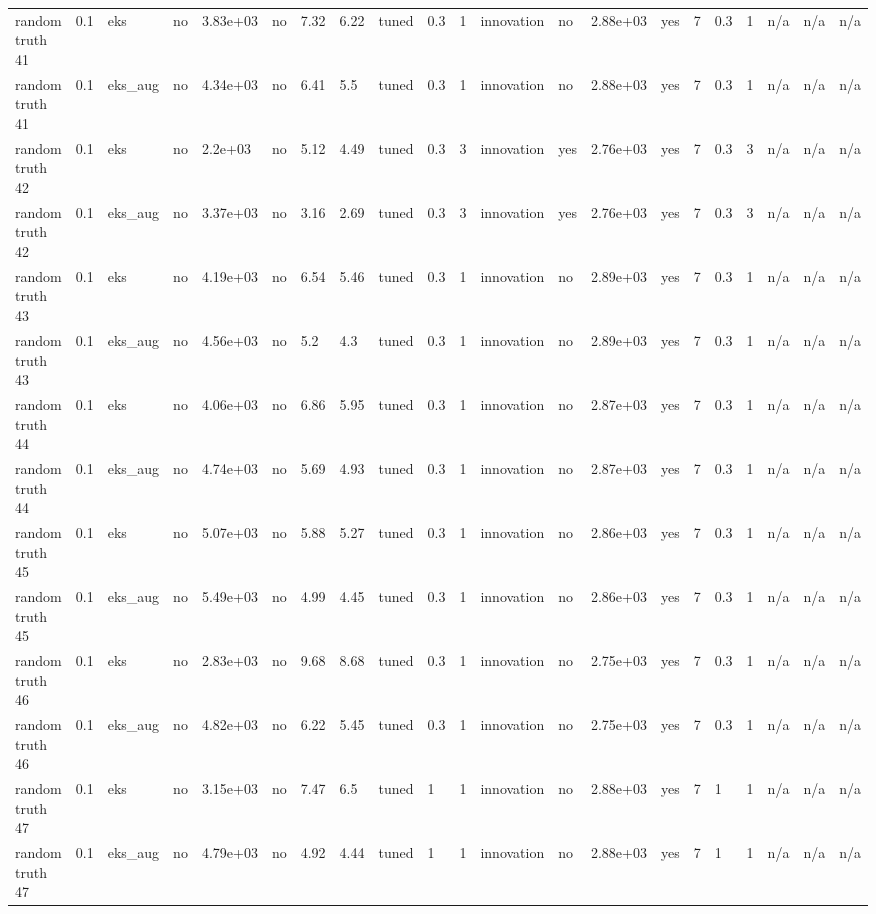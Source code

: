 \begin{table}[t]
\begin{tabular}{lllllllllllllllllllll}
random truth 41 & 0.1 & eks & no & 3.83e+03 & no & 7.32 & 6.22 & tuned & 0.3 & 1 & innovation & no & 2.88e+03 & yes & 7 & 0.3 & 1 & n/a & n/a & n/a \\
random truth 41 & 0.1 & eks\_aug & no & 4.34e+03 & no & 6.41 & 5.5 & tuned & 0.3 & 1 & innovation & no & 2.88e+03 & yes & 7 & 0.3 & 1 & n/a & n/a & n/a \\
random truth 42 & 0.1 & eks & no & 2.2e+03 & no & 5.12 & 4.49 & tuned & 0.3 & 3 & innovation & yes & 2.76e+03 & yes & 7 & 0.3 & 3 & n/a & n/a & n/a \\
random truth 42 & 0.1 & eks\_aug & no & 3.37e+03 & no & 3.16 & 2.69 & tuned & 0.3 & 3 & innovation & yes & 2.76e+03 & yes & 7 & 0.3 & 3 & n/a & n/a & n/a \\
random truth 43 & 0.1 & eks & no & 4.19e+03 & no & 6.54 & 5.46 & tuned & 0.3 & 1 & innovation & no & 2.89e+03 & yes & 7 & 0.3 & 1 & n/a & n/a & n/a \\
random truth 43 & 0.1 & eks\_aug & no & 4.56e+03 & no & 5.2 & 4.3 & tuned & 0.3 & 1 & innovation & no & 2.89e+03 & yes & 7 & 0.3 & 1 & n/a & n/a & n/a \\
random truth 44 & 0.1 & eks & no & 4.06e+03 & no & 6.86 & 5.95 & tuned & 0.3 & 1 & innovation & no & 2.87e+03 & yes & 7 & 0.3 & 1 & n/a & n/a & n/a \\
random truth 44 & 0.1 & eks\_aug & no & 4.74e+03 & no & 5.69 & 4.93 & tuned & 0.3 & 1 & innovation & no & 2.87e+03 & yes & 7 & 0.3 & 1 & n/a & n/a & n/a \\
random truth 45 & 0.1 & eks & no & 5.07e+03 & no & 5.88 & 5.27 & tuned & 0.3 & 1 & innovation & no & 2.86e+03 & yes & 7 & 0.3 & 1 & n/a & n/a & n/a \\
random truth 45 & 0.1 & eks\_aug & no & 5.49e+03 & no & 4.99 & 4.45 & tuned & 0.3 & 1 & innovation & no & 2.86e+03 & yes & 7 & 0.3 & 1 & n/a & n/a & n/a \\
random truth 46 & 0.1 & eks & no & 2.83e+03 & no & 9.68 & 8.68 & tuned & 0.3 & 1 & innovation & no & 2.75e+03 & yes & 7 & 0.3 & 1 & n/a & n/a & n/a \\
random truth 46 & 0.1 & eks\_aug & no & 4.82e+03 & no & 6.22 & 5.45 & tuned & 0.3 & 1 & innovation & no & 2.75e+03 & yes & 7 & 0.3 & 1 & n/a & n/a & n/a \\
random truth 47 & 0.1 & eks & no & 3.15e+03 & no & 7.47 & 6.5 & tuned & 1 & 1 & innovation & no & 2.88e+03 & yes & 7 & 1 & 1 & n/a & n/a & n/a \\
random truth 47 & 0.1 & eks\_aug & no & 4.79e+03 & no & 4.92 & 4.44 & tuned & 1 & 1 & innovation & no & 2.88e+03 & yes & 7 & 1 & 1 & n/a & n/a & n/a \\

\end{tabular}
\end{table}
